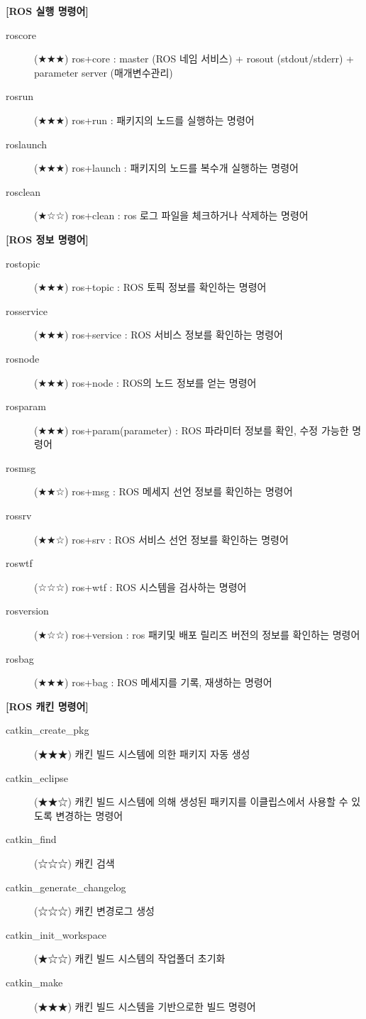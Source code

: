 \vspace{\baselineskip}
\noindent
\textbf{[ROS 실행 명령어]}
\begin{description}
\item[roscore] (★★★) ros+core : master (ROS 네임 서비스) + rosout (stdout/stderr) + parameter server (매개변수관리)
\item[rosrun] (★★★) ros+run : 패키지의 노드를 실행하는 명령어
\item[roslaunch] (★★★) ros+launch : 패키지의 노드를 복수개 실행하는 명령어
\item[rosclean] (★☆☆) ros+clean : ros 로그 파일을 체크하거나 삭제하는 명령어
\end{description}

\vspace{\baselineskip}
\noindent
\textbf{[ROS 정보 명령어]}
\begin{description}
\item[rostopic] (★★★) ros+topic : ROS 토픽 정보를 확인하는 명령어
\item[rosservice] (★★★) ros+service : ROS 서비스 정보를 확인하는 명령어
\item[rosnode] (★★★) ros+node : ROS의 노드 정보를 얻는 명령어
\item[rosparam] (★★★) ros+param(parameter) : ROS 파라미터 정보를 확인, 수정 가능한 명령어
\item[rosmsg] (★★☆) ros+msg : ROS 메세지 선언 정보를 확인하는 명령어
\item[rossrv] (★★☆) ros+srv : ROS 서비스 선언 정보를 확인하는 명령어
\item[roswtf] (☆☆☆) ros+wtf : ROS 시스템을 검사하는 명령어
\item[rosversion] (★☆☆) ros+version : ros 패키및 배포 릴리즈 버전의 정보를 확인하는 명령어
\item[rosbag] (★★★) ros+bag : ROS 메세지를 기록, 재생하는 명령어
\end{description}

\vspace{\baselineskip}
\noindent
\textbf{[ROS 캐킨 명령어]}
\begin{description}
\item[catkin\_create\_pkg] (★★★) 캐킨 빌드 시스템에 의한 패키지 자동 생성
\item[catkin\_eclipse] (★★☆) 캐킨 빌드 시스템에 의해 생성된 패키지를 이클립스에서 사용할 수 있도록 변경하는 명령어
\item[catkin\_find] (☆☆☆) 캐킨 검색
\item[catkin\_generate\_changelog] (☆☆☆) 캐킨 변경로그 생성
\item[catkin\_init\_workspace] (★☆☆) 캐킨 빌드 시스템의 작업폴더 초기화
\item[catkin\_make] (★★★) 캐킨 빌드 시스템을 기반으로한 빌드 명령어
\end{description}

